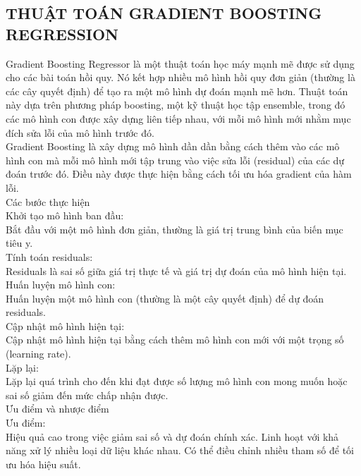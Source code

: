 \documentclass{article}
\begin{document}
\begin{multicols}{2}
       \subsection{THUẬT TOÁN GRADIENT BOOSTING REGRESSION}
       Gradient Boosting Regressor là một thuật toán học máy mạnh mẽ được sử dụng cho các bài toán hồi quy. Nó kết hợp nhiều mô hình hồi quy đơn giản (thường là các cây quyết định) để tạo ra một mô hình dự đoán mạnh mẽ hơn. Thuật toán này dựa trên phương pháp boosting, một kỹ thuật học tập ensemble, trong đó các mô hình con được xây dựng liên tiếp nhau, với mỗi mô hình mới nhằm mục đích sửa lỗi của mô hình trước đó.\\
       Gradient Boosting là xây dựng mô hình dần dần bằng cách thêm vào các mô hình con mà mỗi mô hình mới tập trung vào việc sửa lỗi (residual) của các dự đoán trước đó. Điều này được thực hiện bằng cách tối ưu hóa gradient của hàm lỗi.\\
       Các bước thực hiện\\
       
       Khởi tạo mô hình ban đầu:\\
       Bắt đầu với một mô hình đơn giản, thường là giá trị trung bình của biến mục tiêu y.\\
       
       Tính toán residuals:\\
       Residuals là sai số giữa giá trị thực tế và giá trị dự đoán của mô hình hiện tại.\\
       
       Huấn luyện mô hình con:\\
       Huấn luyện một mô hình con (thường là một cây quyết định) để dự đoán residuals.\\
       
       Cập nhật mô hình hiện tại:\\
       Cập nhật mô hình hiện tại bằng cách thêm mô hình con mới với một trọng số (learning rate).\\
       
       Lặp lại:\\
       Lặp lại quá trình cho đến khi đạt được số lượng mô hình con mong muốn hoặc sai số giảm đến mức chấp nhận được.\\
       
       Ưu điểm và nhược điểm\\
       
       Ưu điểm:\\
       Hiệu quả cao trong việc giảm sai số và dự đoán chính xác.
       Linh hoạt với khả năng xử lý nhiều loại dữ liệu khác nhau.
       Có thể điều chỉnh nhiều tham số để tối ưu hóa hiệu suất.\\
       

\end{multicols}
\end{document}
